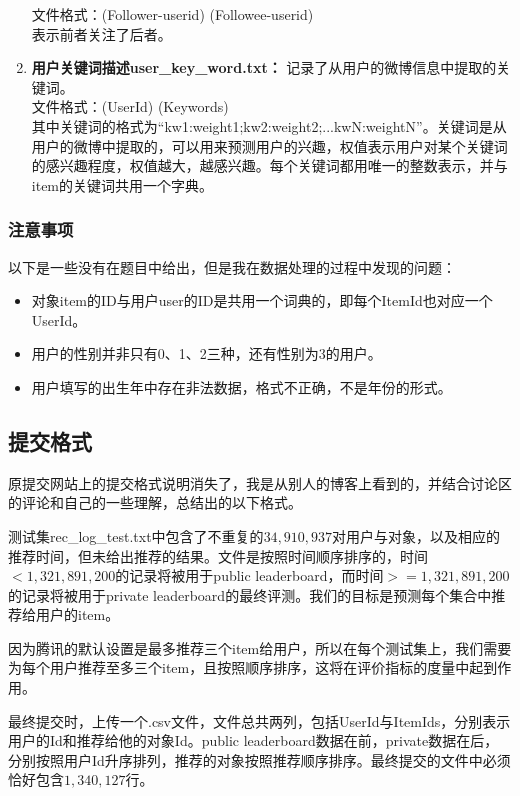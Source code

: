 \documentclass[12pt]{article} %
\begin{document}
\begin{sloppypar}
\begin{enumerate}
	文件格式：(Follower-userid) (Followee-userid) \\
	表示前者关注了后者。
	\item {\bf 用户关键词描述user\_key\_word.txt：} 记录了从用户的微博信息中提取的关键词。\\
	文件格式：(UserId) (Keywords) \\
	其中关键词的格式为“kw1:weight1;kw2:weight2;...kwN:weightN”。关键词是从用户的微博中提取的，可以用来预测用户的兴趣，权值表示用户对某个关键词的感兴趣程度，权值越大，越感兴趣。每个关键词都用唯一的整数表示，并与item的关键词共用一个字典。
\end{enumerate}

\subsubsection{注意事项}

以下是一些没有在题目中给出，但是我在数据处理的过程中发现的问题：
\begin{itemize}
\item 对象item的ID与用户user的ID是共用一个词典的，即每个ItemId也对应一个UserId。
\item 用户的性别并非只有0、1、2三种，还有性别为3的用户。
\item 用户填写的出生年中存在非法数据，格式不正确，不是年份的形式。
\end{itemize}

\subsection{提交格式}

原提交网站上的提交格式说明消失了，我是从别人的博客上看到的，并结合讨论区的评论和自己的一些理解，总结出的以下格式。

测试集rec\_log\_test.txt中包含了不重复的$34,910,937$对用户与对象，以及相应的推荐时间，但未给出推荐的结果。文件是按照时间顺序排序的，时间$<1,321,891,200$的记录将被用于public leaderboard，而时间$>=1,321,891,200$的记录将被用于private leaderboard的最终评测。我们的目标是预测每个集合中推荐给用户的item。

因为腾讯的默认设置是最多推荐三个item给用户，所以在每个测试集上，我们需要为每个用户推荐至多三个item，且按照顺序排序，这将在评价指标的度量中起到作用。

最终提交时，上传一个.csv文件，文件总共两列，包括UserId与ItemIds，分别表示用户的Id和推荐给他的对象Id。public leaderboard数据在前，private数据在后，分别按照用户Id升序排列，推荐的对象按照推荐顺序排序。最终提交的文件中必须恰好包含$1,340,127$行。


\end{sloppypar}
\end{document}
